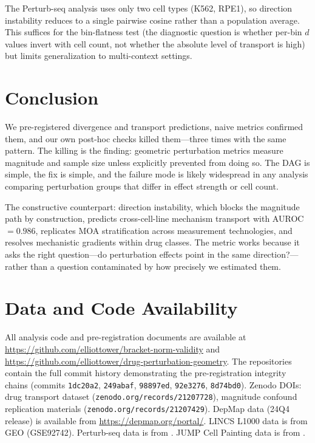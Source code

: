 \documentclass[11pt]{article}
\begin{document}
The Perturb-seq analysis uses only two cell types (K562, RPE1), so
direction instability reduces to a single pairwise cosine rather than
a population average. This suffices for the bin-flatness test (the
diagnostic question is whether per-bin $d$ values invert with cell
count, not whether the absolute level of transport is high) but limits
generalization to multi-context settings.

\section{Conclusion}

We pre-registered divergence and transport predictions, naive metrics
confirmed them, and our own post-hoc checks killed them---three times
with the same pattern. The killing is the finding: geometric
perturbation metrics measure magnitude and sample size unless explicitly
prevented from doing so. The DAG is simple, the fix is simple, and the
failure mode is likely widespread in any analysis comparing perturbation
groups that differ in effect strength or cell count.

The constructive counterpart: direction instability, which blocks the
magnitude path by construction, predicts cross-cell-line mechanism
transport with AUROC $= 0.986$, replicates MOA stratification across
measurement technologies, and resolves mechanistic gradients within
drug classes. The metric works because it asks the right question---do
perturbation effects point in the same direction?---rather than a
question contaminated by how precisely we estimated them.

\section*{Data and Code Availability}

All analysis code and pre-registration documents are available at
\url{https://github.com/elliottower/bracket-norm-validity} and
\url{https://github.com/elliottower/drug-perturbation-geometry}.
The repositories contain the full commit history demonstrating the
pre-registration integrity chains (commits \texttt{1dc20a2},
\texttt{249abaf}, \texttt{98897ed}, \texttt{92e3276}, \texttt{8d74bd0}).
Zenodo DOIs: drug transport dataset
(\texttt{zenodo.org/records/21207728}), magnitude confound replication
materials (\texttt{zenodo.org/records/21207429}).
DepMap data (24Q4 release) is available from
\url{https://depmap.org/portal/}. LINCS L1000 data is from GEO
(GSE92742). Perturb-seq data is from \citet{replogle2022mapping}. JUMP
Cell Painting data is from \citet{chandrasekaran2023jump}.
\end{document}
